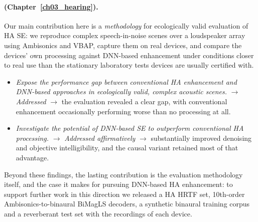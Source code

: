 \paragraph{ (Chapter~\ref{ch03_hearing}).}
Our main contribution here is a \emph{methodology} for ecologically valid
evaluation of \acrshort{HA} \acrfull{SE}: we reproduce complex speech-in-noise
scenes over a loudspeaker array using Ambisonics and \acrshort{VBAP}, capture
them on real devices, and compare the devices' own processing against
\acrshort{DNN}-based enhancement under conditions closer to real use than the
stationary laboratory tests devices are usually certified with.
\begin{itemize}
    \item[\RO{1}] \emph{Expose the performance gap between conventional
    \acrshort{HA} enhancement and \acrshort{DNN}-based approaches in
    ecologically valid, complex acoustic scenes.} $\rightarrow$ \textit{Addressed}
    $\rightarrow$ the evaluation revealed a clear gap, with conventional
    enhancement occasionally performing worse than no processing at all.
    \item[\RO{2}] \emph{Investigate the potential of \acrshort{DNN}-based
    \acrshort{SE} to outperform conventional \acrshort{HA} processing.}
    $\rightarrow$ \textit{Addressed affirmatively} $\rightarrow$ 
    substantially improved denoising and objective intelligibility, and the
    causal variant retained most of that advantage.
\end{itemize}
Beyond these findings, the lasting contribution is the evaluation methodology
itself, and the case it makes for pursuing \acrshort{DNN}-based \acrshort{HA}
enhancement: to support further work in this direction we released a
\acrshort{HA} \acrshort{HRTF} set, 10th-order Ambisonics-to-binaural
\acrshort{BiMagLS} decoders, a synthetic binaural training corpus and a
reverberant test set with the recordings of each device.


